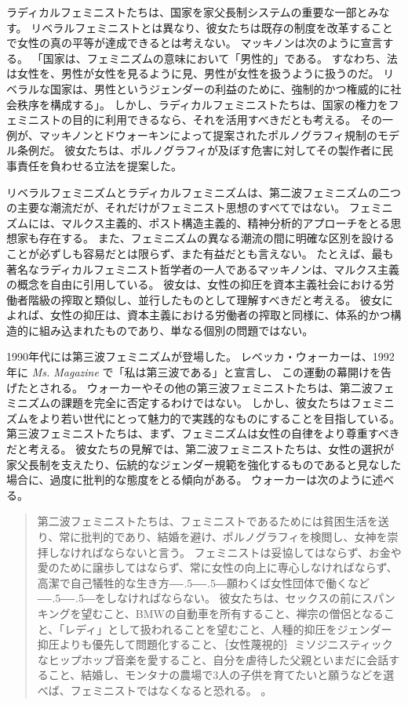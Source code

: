 \documentclass[paper=a4,book,openany]{jlreq}
\def\DDASH{―\kern-.5\zw―\kern-.5\zw―} %
\begin{document}
ラディカルフェミニストたちは、国家を家父長制システムの重要な一部とみなす。
リベラルフェミニストとは異なり、彼女たちは既存の制度を改革することで女性の真の平等が達成できるとは考えない。
マッキノンは次のように宣言する。
「国家は、フェミニズムの意味において「男性的」である。
すなわち、法は女性を、男性が女性を見るように見、男性が女性を扱うように扱うのだ。
リベラルな国家は、男性というジェンダーの利益のために、強制的かつ権威的に社会秩序を構成する」\citep[pp.161--162]{mackinnon89:_towar_femin_theor_of_state}。
しかし、ラディカルフェミニストたちは、国家の権力をフェミニストの目的に利用できるなら、それを活用すべきだとも考える。
その一例が、マッキノンとドウォーキンによって提案されたポルノグラフィ規制のモデル条例だ。
彼女たちは、ポルノグラフィが及ぼす危害に対してその製作者に民事責任を負わせる立法を提案した。

リベラルフェミニズムとラディカルフェミニズムは、第二波フェミニズムの二つの主要な潮流だが、それだけがフェミニスト思想のすべてではない。
フェミニズムには、マルクス主義的、ポスト構造主義的、精神分析的アプローチをとる思想家も存在する。
また、フェミニズムの異なる潮流の間に明確な区別を設けることが必ずしも容易だとは限らず、また有益だとも言えない。
たとえば、最も著名なラディカルフェミニスト哲学者の一人であるマッキノンは、マルクス主義の概念を自由に引用している。
彼女は、女性の抑圧を資本主義社会における労働者階級の搾取と類似し、並行したものとして理解すべきだと考える。
彼女によれば、女性の抑圧は、資本主義における労働者の搾取と同様に、体系的かつ構造的に組み込まれたものであり、単なる個別の問題ではない\citep[p.515]{mackinnon82:_femin_marx_meth_stat}。

1990年代には第三波フェミニズムが登場した\citep[cf.][]{snyder08:_what_is_thir_wave_femin}。
レベッカ・ウォーカーは、1992年に \emph{Ms. Magazine} で「私は第三波である」と宣言し\citep{walker92:_becom_thir_wave}、
この運動の幕開けを告げたとされる。
ウォーカーやその他の第三波フェミニストたちは、第二波フェミニズムの課題を完全に否定するわけではない。
しかし、彼女たちはフェミニズムをより若い世代にとって魅力的で実践的なものにすることを目指している。
第三波フェミニストたちは、まず、フェミニズムは女性の自律をより尊重すべきだと考える。
彼女たちの見解では、第二波フェミニストたちは、女性の選択が家父長制を支えたり、伝統的なジェンダー規範を強化するものであると見なした場合に、過度に批判的な態度をとる傾向がある\citep[p.xxii]{hernández02:_colon_this}。
ウォーカーは次のように述べる。

\begin{quote}
  第二波フェミニストたちは、フェミニストであるためには貧困生活を送り、常に批判的であり、結婚を避け、ポルノグラフィを検閲し、女神を崇拝しなければならないと言う。
フェミニストは妥協してはならず、お金や愛のために譲歩してはならず、常に女性の向上に専心しなければならず、高潔で自己犠牲的な生き方{\DDASH}願わくば女性団体で働くなど{\DDASH}をしなければならない。
彼女たちは、セックスの前にスパンキングを望むこと、BMWの自動車を所有すること、禅宗の僧侶となること、「レディ」として扱われることを望むこと、人種的抑圧をジェンダー抑圧よりも優先して問題化すること、｛女性蔑視的｝{ミソジニスティック}なヒップホップ音楽を愛すること、自分を虐待した父親といまだに会話すること、結婚し、モンタナの農場で3人の子供を育てたいと願うなどを選べば、フェミニストではなくなると恐れる。
\citep[p.xxxii]{walker95:_to_be_real}。
\end{quote}
\end{document}
